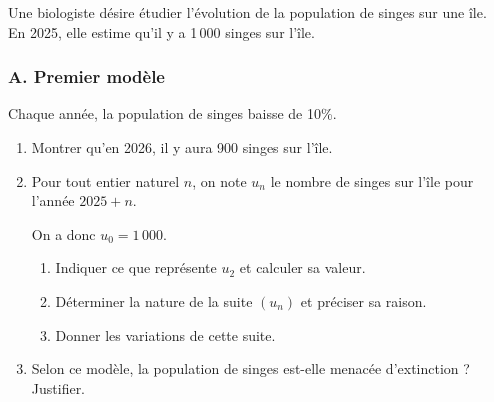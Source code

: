 Une biologiste désire étudier l'évolution de la population de singes sur une île. \\
En 2025, elle estime qu'il y a 1\,000 singes sur l'île.

\subsubsection*{A. Premier modèle}
Chaque année, la population de singes baisse de 10\%.

\begin{enumerate}
\item Montrer qu'en 2026, il y aura 900 singes sur l'île.

\item Pour tout entier naturel $n$, on note $u_n$ le nombre de singes sur l'île pour l'année $2025 + n$.

On a donc $u_0 = 1\,000$.

\begin{enumerate}
\item Indiquer ce que représente $u_2$ et calculer sa valeur.
\item Déterminer la nature de la suite $(u_n)$ et préciser sa raison.
\item Donner les variations de cette suite.
\end{enumerate}

\item Selon ce modèle, la population de singes est-elle menacée d'extinction ? Justifier.
\end{enumerate}

\bigskip

